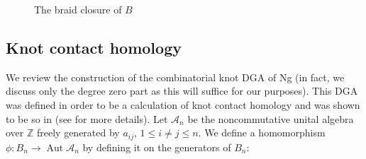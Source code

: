 \documentclass{amsart}[11pt,fullpage]
\def\Z{{\mathbb Z}}
\def\A{{\mathcal A}}
\newcommand\Aut{\operatorname{Aut}}
\theoremstyle{definition}
\begin{document}
    \begin{figure}[ht]
      \caption{The braid closure of $B$}
      \label{fig:BClosure}
    \end{figure}

\subsection{Knot contact homology}
\label{SecBG_KCHdef}

  We review the construction of the combinatorial knot DGA of Ng (in fact, we discuss only the degree zero part as this will suffice for our purposes). This DGA was defined in order to be a calculation of knot contact homology and was shown to be so in \cite{EENS12} (see \cite{Ng12} for more details). Let $\A_n$ be the noncommutative unital algebra over $\Z$ freely generated by $a_{ij}$, $1\le i\ne j\le n$. We define a homomorphism $\phi : B_n \rightarrow\Aut \A_n$ by defining it on the generators of $B_n$:
\end{document}
